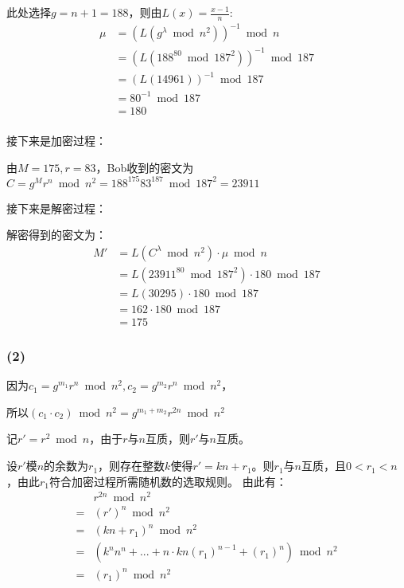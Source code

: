 \documentclass[twoside,11pt]{article}
\begin{document}
此处选择$g=n+1=188$，则由$L(x)=\frac{x-1}{n}$:
\begin{align*}
    \mu & =(L(g^\lambda \bmod{n^2}))^{-1} \bmod{n}    \\
        & =(L(188^{80} \bmod{187^2}))^{-1} \bmod{187} \\
        & =(L(14961))^{-1} \bmod{187}                 \\
        & = 80^{-1} \bmod{187}                        \\
        & = 180                                       \\
\end{align*}

接下来是加密过程：

由$M=175, r=83$，Bob收到的密文为$C=g^M r^n \bmod{n^2} = 188^{175} 83^{187} \bmod{187^2} = 23911$

接下来是解密过程：

解密得到的密文为：
\begin{align*}
    M' & =L(C^\lambda \bmod{n^2}) \cdot \mu \bmod{n}      \\
       & =L(23911^{80} \bmod{187^2}) \cdot 180 \bmod{187} \\
       & =L(30295) \cdot 180 \bmod{187}                   \\
       & = 162 \cdot 180 \bmod{187}                       \\
       & = 175
\end{align*}

\subsubsection*{(2)}
因为$c_1=g^{m_1} r^n \bmod{n^2}, c_2=g^{m_2} r^n \bmod{n^2}$，

所以$(c_1 \cdot c_2) \bmod{n^2} = g^{m_1+m_2} r^{2n} \bmod{n^2}$

记$r'=r^2 \bmod{n}$，由于$r$与$n$互质，则$r'$与$n$互质。

设$r'$模$n$的余数为$r_1$，则存在整数$k$使得$r' = kn + r_1$。则$r_1$与$n$互质，且$0<r_1<n$，由此$r_1$符合加密过程所需随机数的选取规则。
由此有：
\begin{align*}
      & r^{2n} \bmod{n^2}                                              \\
    = & (r')^{n} \bmod{n^2}                                            \\
    = & (kn + r_1)^{n} \bmod{n^2}                                      \\
    = & (k^n n^n + ... + n \cdot kn(r_1)^{n-1} + (r_1)^{n}) \bmod{n^2} \\
    = & (r_1)^{n} \bmod{n^2}                                           \\
\end{align*}
\end{document}

